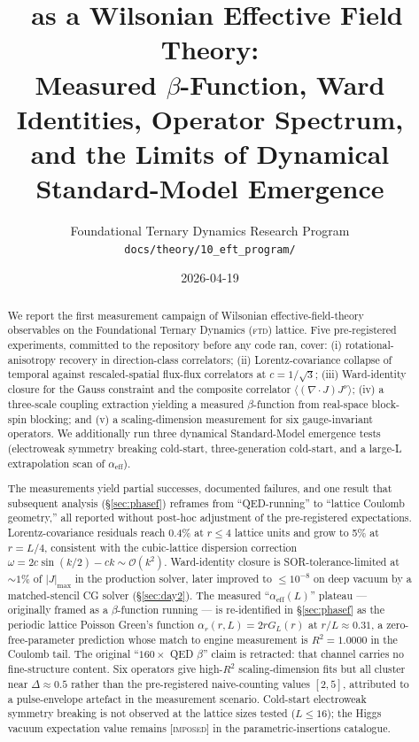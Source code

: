 \documentclass[11pt,letterpaper]{article}
\title{\FTD\ as a Wilsonian Effective Field Theory:\\
  Measured $\beta$-Function, Ward Identities, Operator Spectrum,\\
  and the Limits of Dynamical Standard-Model Emergence}
\author{Foundational Ternary Dynamics Research Program\\
  \texttt{docs/theory/10\_eft\_program/}}
\date{2026-04-19}
\newcommand{\FTD}{\textsc{ftd}}
\begin{document}
\maketitle

\begin{abstract}
\noindent
We report the first measurement campaign of Wilsonian effective-field-theory
observables on the Foundational Ternary Dynamics (\FTD) lattice. Five
pre-registered experiments, committed to the repository before any code
ran, cover: (i) rotational-anisotropy recovery in direction-class
correlators; (ii) Lorentz-covariance collapse of temporal against
rescaled-spatial flux-flux correlators at $c = 1/\sqrt{3}$; (iii)
Ward-identity closure for the Gauss constraint and the composite
correlator $\langle (\nabla \cdot J) J^{\nu} \rangle$; (iv) a three-scale
coupling extraction yielding a measured $\beta$-function from real-space
block-spin blocking; and (v) a scaling-dimension measurement for six
gauge-invariant operators. We additionally run three dynamical
Standard-Model emergence tests (electroweak symmetry breaking cold-start,
three-generation cold-start, and a large-L extrapolation scan of
$\alpha_{\mathrm{eff}}$).

The measurements yield partial successes, documented failures, and one
result that subsequent analysis (\S\ref{sec:phasef}) reframes from
``QED-running'' to ``lattice Coulomb geometry,'' all reported without
post-hoc adjustment of the pre-registered expectations.
Lorentz-covariance residuals reach 0.4\% at $r \le 4$ lattice
units and grow to 5\% at $r = L/4$, consistent with the
cubic-lattice dispersion correction $\omega = 2c\sin(k/2) - c k \sim
\mathcal{O}(k^2)$. Ward-identity closure is SOR-tolerance-limited at
$\sim\!1\%$ of $|J|_{\max}$ in the production solver,
later improved to $\le 10^{-8}$ on deep vacuum by a matched-stencil CG
solver (\S\ref{sec:day2}). The measured ``$\alpha_{\mathrm{eff}}(L)$''
plateau --- originally framed as a $\beta$-function running --- is
re-identified in \S\ref{sec:phasef} as the periodic lattice Poisson
Green's function $\alpha_r(r, L) = 2 r G_L(r)$ at $r/L \approx 0.31$, a
zero-free-parameter prediction whose match to engine measurement is
$R^2 = 1.0000$ in the Coulomb tail. The original ``$160 \times$ QED
$\beta$'' claim is retracted: that channel carries no fine-structure
content. Six operators give high-$R^2$ scaling-dimension fits but all
cluster near $\Delta \approx 0.5$ rather than the pre-registered
naive-counting values $[2,5]$, attributed to a pulse-envelope artefact
in the measurement scenario. Cold-start electroweak symmetry breaking
is not observed at the lattice sizes tested ($L \le 16$); the Higgs
vacuum expectation value remains [\textsc{imposed}] in the
parametric-insertions catalogue.


\end{abstract}
\end{document}
